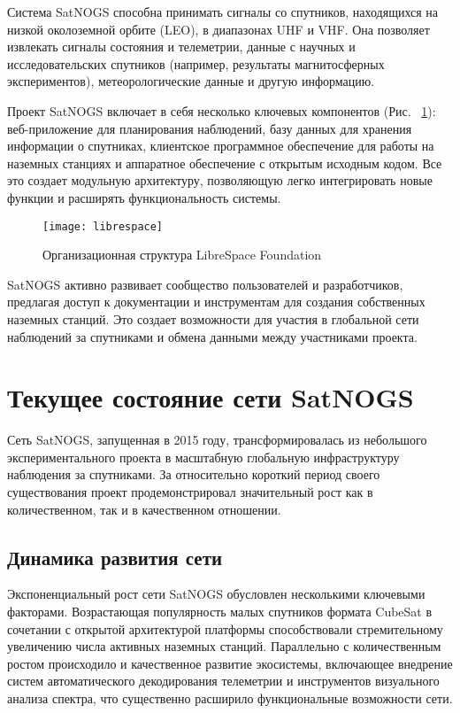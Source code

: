Система SatNOGS способна принимать сигналы со спутников, находящихся на низкой
околоземной орбите (LEO), в диапазонах UHF и VHF. Она позволяет извлекать
сигналы состояния и телеметрии, данные с научных и исследовательских спутников
(например, результаты магнитосферных экспериментов), метеорологические данные и
другую информацию.

Проект SatNOGS включает в себя несколько ключевых компонентов (Рис. ~\ref{fig:librespace}): веб-приложение
для планирования наблюдений, базу данных для хранения информации о спутниках,
клиентское программное обеспечение для работы на наземных станциях и аппаратное
обеспечение с открытым исходным кодом. Все это создает модульную архитектуру,
позволяющую легко интегрировать новые функции и расширять функциональность
системы.

\begin{figure}[H]
	\centering
	\texttt{[image: librespace]}
	\caption{Организационная структура LibreSpace Foundation}
	\label{fig:librespace}
\end{figure}

SatNOGS активно развивает сообщество пользователей и разработчиков, предлагая
доступ к документации и инструментам для создания собственных наземных станций.
Это создает возможности для участия в глобальной сети наблюдений за спутниками и
обмена данными между участниками проекта.

\section{Текущее состояние сети SatNOGS}

Сеть SatNOGS, запущенная в 2015 году, трансформировалась из небольшого
экспериментального проекта в масштабную глобальную инфраструктуру наблюдения за
спутниками. За относительно короткий период своего существования проект
продемонстрировал значительный рост как в количественном, так и в качественном
отношении.

\subsection{Динамика развития сети}

Экспоненциальный рост сети SatNOGS обусловлен несколькими ключевыми факторами.
Возрастающая популярность малых спутников формата CubeSat в сочетании с
открытой архитектурой платформы способствовали стремительному увеличению числа
активных наземных станций. Параллельно с количественным ростом происходило и
качественное развитие экосистемы, включающее внедрение систем автоматического
декодирования телеметрии и инструментов визуального анализа спектра, что
существенно расширило функциональные возможности сети.

